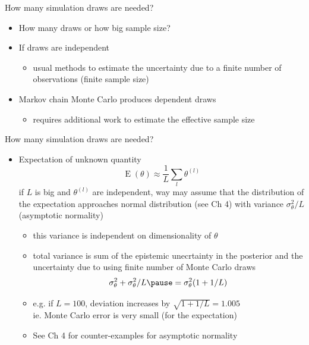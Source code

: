 \documentclass[finnish,english,t]{beamer}
\renewcommand{\emph}[1]{\textcolor{navyblue}{#1}}
\DeclareMathOperator{\E}{E}
\begin{document}
\begin{frame}

  
  {\Large\color{navyblue} How many simulation draws are needed?}

  \begin{itemize}
  \item How many draws or how big sample size?
  \item If draws are independent
    \begin{itemize}
    \item usual methods to estimate the uncertainty due to a finite
      number of observations (finite sample size)
    \end{itemize}
  \item Markov chain Monte Carlo produces dependent draws
    \begin{itemize}
    \item requires additional work to estimate the \emph{effective
        sample size}
    \end{itemize}
  \end{itemize}

\end{frame}

\begin{frame}
  
  {\Large\color{navyblue} How many simulation draws are needed?}

  \begin{itemize}
  \item Expectation of unknown quantity
    \begin{equation*}
      \E(\theta)\approx \frac{1}{L}\sum_l \theta^{(l)}
    \end{equation*}
    if $L$ is big and $\theta^{(l)}$ are independent, way may assume
    that the distribution of the expectation approaches normal
    distribution (see Ch 4) with variance $\sigma^2_\theta/L$
    (asymptotic normality)
    \begin{itemize}
    \item this variance is independent on dimensionality of $\theta$
      \pause
    \item total variance is sum of the epistemic unecrtainty in the
      posterior and the uncertainty due to using finite number of
      Monte Carlo draws
      \begin{equation*}
        \sigma^2_\theta+\sigma^2_\theta/L \pause= \sigma^2_\theta(1+1/L)
      \end{equation*}
      \pause
      \vspace{-5mm}
    \item e.g. if $L=100$, deviation increases by $\sqrt{1+1/L}=1.005$\\
      ie. Monte Carlo error is very small (for the expectation)
      \pause
    \item See Ch 4 for counter-examples for asymptotic normality
    \end{itemize}
\end{itemize}

\end{frame}
\end{document}

